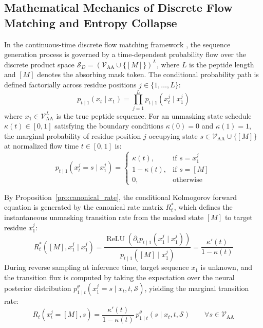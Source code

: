 \subsection{Mathematical Mechanics of Discrete Flow Matching and Entropy Collapse}

In the continuous-time discrete flow matching framework \citep{Campbell2024, Gat2024}, the sequence generation process is governed by a time-dependent probability flow over the discrete product space $\mathcal{S}_D = (\mathcal{V}_{\text{AA}} \cup \{[M]\})^L$, where $L$ is the peptide length and $[M]$ denotes the absorbing mask token. The conditional probability path is defined factorially across residue positions $j \in \{1, \dots, L\}$:
\begin{equation}
p_{t \mid 1}(x_t \mid x_1) = \prod_{j=1}^L p_{t \mid 1}(x_t^j \mid x_1^j)
\label{eq:app_cond_prod_flow}
\end{equation}
where $x_1 \in \mathcal{V}_{\text{AA}}^L$ is the true peptide sequence. For an unmasking state schedule $\kappa(t) \in [0, 1]$ satisfying the boundary conditions $\kappa(0) = 0$ and $\kappa(1) = 1$, the marginal probability of residue position $j$ occupying state $s \in \mathcal{V}_{\text{AA}} \cup \{[M]\}$ at normalized flow time $t \in [0, 1]$ is:
\begin{equation}
p_{t \mid 1}(x_t^j = s \mid x_1^j) = 
\begin{cases}
\kappa(t), & \text{if } s = x_1^j \\
1 - \kappa(t), & \text{if } s = [M] \\
0, & \text{otherwise}
\end{cases}
\label{eq:app_marginal_flow_def}
\end{equation}

By Proposition~\ref{pro:canonical_rate}, the conditional Kolmogorov forward equation is generated by the canonical rate matrix $R_t^*$, which defines the instantaneous unmasking transition rate from the masked state $[M]$ to target residue $x_1^j$:
\begin{equation}
R_t^*([M], x_1^j \mid x_1^j) = \frac{\operatorname{ReLU}\left(\partial_t p_{t \mid 1}(x_1^j \mid x_1^j)\right)}{p_{t \mid 1}([M] \mid x_1^j)} = \frac{\kappa'(t)}{1 - \kappa(t)}
\label{eq:app_jump_flux_rate}
\end{equation}
During reverse sampling at inference time, target sequence $x_1$ is unknown, and the transition flux is computed by taking the expectation over the neural posterior distribution $p_{1 \mid t}^\theta(x_1^j = s \mid x_t, t, \mathcal{S})$, yielding the marginal transition rate:
\begin{equation}
R_t(x_t^j = [M], s) = \frac{\kappa'(t)}{1 - \kappa(t)} \, p_{1 \mid t}^\theta(s \mid x_t, t, \mathcal{S}) \qquad \forall s \in \mathcal{V}_{\text{AA}}
\label{eq:app_neural_flux}
\end{equation}

